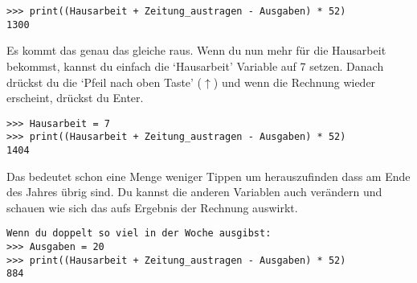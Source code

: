 \begin{Verbatim}[frame=single]
>>> print((Hausarbeit + Zeitung_austragen - Ausgaben) * 52)
1300
\end{Verbatim}

Es kommt das genau das gleiche raus. Wenn du nun  mehr für die Hausarbeit bekommst, kannst du einfach die `Hausarbeit' Variable auf 7 setzen. Danach drückst du die `Pfeil nach oben Taste' ($\uparrow$) und wenn die Rechnung wieder erscheint, drückst du Enter.

\begin{Verbatim}[frame=single]
>>> Hausarbeit = 7
>>> print((Hausarbeit + Zeitung_austragen - Ausgaben) * 52)
1404
\end{Verbatim}

Das bedeutet schon eine Menge weniger Tippen um herauszufinden dass am Ende des Jahres  übrig sind. Du kannst die anderen Variablen auch verändern und schauen wie sich das aufs Ergebnis der Rechnung auswirkt.

\begin{Verbatim}[frame=single]
Wenn du doppelt so viel in der Woche ausgibst:
>>> Ausgaben = 20
>>> print((Hausarbeit + Zeitung_austragen - Ausgaben) * 52)
884
\end{Verbatim}


